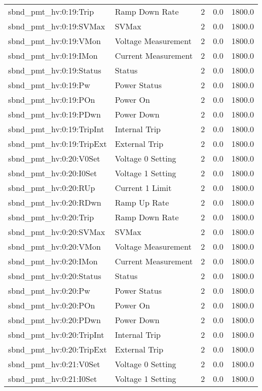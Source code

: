 \begin{center}
\begin{longtable}{l | l l l l }
sbnd\_pmt\_hv:0:19:Trip & Ramp Down Rate & 2 & 0.0 & 1800.0\\ 
sbnd\_pmt\_hv:0:19:SVMax & SVMax & 2 & 0.0 & 1800.0\\ 
sbnd\_pmt\_hv:0:19:VMon & Voltage Measurement & 2 & 0.0 & 1800.0\\ 
sbnd\_pmt\_hv:0:19:IMon & Current Measurement & 2 & 0.0 & 1800.0\\ 
sbnd\_pmt\_hv:0:19:Status & Status & 2 & 0.0 & 1800.0\\ 
sbnd\_pmt\_hv:0:19:Pw & Power Status & 2 & 0.0 & 1800.0\\ 
sbnd\_pmt\_hv:0:19:POn & Power On & 2 & 0.0 & 1800.0\\ 
sbnd\_pmt\_hv:0:19:PDwn & Power Down & 2 & 0.0 & 1800.0\\ 
sbnd\_pmt\_hv:0:19:TripInt & Internal Trip & 2 & 0.0 & 1800.0\\ 
sbnd\_pmt\_hv:0:19:TripExt & External Trip & 2 & 0.0 & 1800.0\\ 
sbnd\_pmt\_hv:0:20:V0Set & Voltage 0 Setting & 2 & 0.0 & 1800.0\\ 
sbnd\_pmt\_hv:0:20:I0Set & Voltage 1 Setting & 2 & 0.0 & 1800.0\\ 
sbnd\_pmt\_hv:0:20:RUp & Current 1 Limit & 2 & 0.0 & 1800.0\\ 
sbnd\_pmt\_hv:0:20:RDwn & Ramp Up Rate & 2 & 0.0 & 1800.0\\ 
sbnd\_pmt\_hv:0:20:Trip & Ramp Down Rate & 2 & 0.0 & 1800.0\\ 
sbnd\_pmt\_hv:0:20:SVMax & SVMax & 2 & 0.0 & 1800.0\\ 
sbnd\_pmt\_hv:0:20:VMon & Voltage Measurement & 2 & 0.0 & 1800.0\\ 
sbnd\_pmt\_hv:0:20:IMon & Current Measurement & 2 & 0.0 & 1800.0\\ 
sbnd\_pmt\_hv:0:20:Status & Status & 2 & 0.0 & 1800.0\\ 
sbnd\_pmt\_hv:0:20:Pw & Power Status & 2 & 0.0 & 1800.0\\ 
sbnd\_pmt\_hv:0:20:POn & Power On & 2 & 0.0 & 1800.0\\ 
sbnd\_pmt\_hv:0:20:PDwn & Power Down & 2 & 0.0 & 1800.0\\ 
sbnd\_pmt\_hv:0:20:TripInt & Internal Trip & 2 & 0.0 & 1800.0\\ 
sbnd\_pmt\_hv:0:20:TripExt & External Trip & 2 & 0.0 & 1800.0\\ 
sbnd\_pmt\_hv:0:21:V0Set & Voltage 0 Setting & 2 & 0.0 & 1800.0\\ 
sbnd\_pmt\_hv:0:21:I0Set & Voltage 1 Setting & 2 & 0.0 & 1800.0\\ 

\end{longtable}
\end{center}
